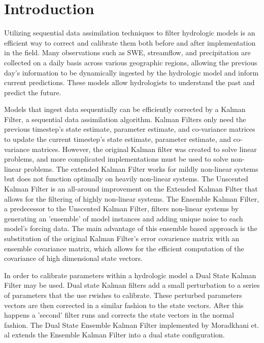 \chapter{Introduction}



	Utilizing sequential data assimilation techniques to filter hydrologic models is an efficient way to correct and calibrate them both before and after implementation in the field. Many observations such as SWE, streamflow, and precipitation are collected on a daily basis across various geographic regions, allowing the previous day's information to be dynamically ingested by the hydrologic model and inform current predictions. These models allow hydrologists to understand the past and predict the future.
	
	Models that ingest data sequentially can be efficiently corrected by a Kalman Filter, a sequential data assimilation algorithm. Kalman Filters only need the previous timestep's state estimate, parameter estimate, and co-variance matrices to update the current timestep's state estimate, parameter estimate, and co-variance matrices. However, the original Kalman filter\cite{Kalman1960} was created to solve linear problems, and more complicated implementations must be used to solve non-linear problems. The extended Kalman Filter\cite{Jazwinski1970} works for mildly non-linear systems but does not function optimally on heavily non-linear systems\cite{Miller1994}. The Unscented Kalman Filter\cite{Julier1997} is an all-around improvement on the Extended Kalman Filter that allows for the filtering of highly non-linear systems. The Ensemble Kalman Filter\cite{Evensen1994}, a predecessor to the Unscented Kalman Filter, filters non-linear systems by generating an 'ensemble' of model instances and adding unique noise to each model's forcing data. The main advantage of this ensemble based approach is the substitution of the original Kalman Filter's error covarience matrix with an ensemble covariance matrix, which allows for the efficient computation of the covariance of high dimensional state vectors. 
	
	In order to calibrate parameters within a hydrologic model a Dual State Kalman Filter may be used. Dual state Kalman filters add a small perturbation to a series of parameters that the use rwishes to calibrate. These perturbed parameters vectors are then corrected in a similar fashion to the state vectors. After this happens a 'second' filter runs and corrects the state vectors in the normal fashion. The Dual State Ensemble Kalman Filter implemented by Moradkhani et. al\cite{Moradkhani2005} extends the Ensemble Kalman Filter into a dual state configuration.
	
